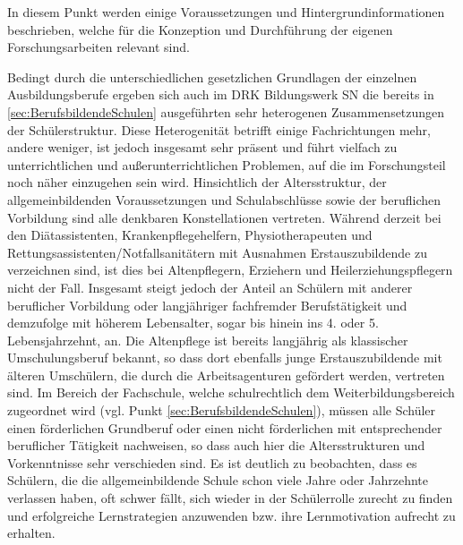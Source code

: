 In diesem Punkt werden einige Voraussetzungen und Hintergrundinformationen beschrieben, welche für die Konzeption und Durchführung der eigenen Forschungsarbeiten relevant sind. 

Bedingt durch die unterschiedlichen gesetzlichen Grundlagen der einzelnen Ausbildungsberufe ergeben sich auch im DRK Bildungswerk SN die bereits in \ref{sec:BerufsbildendeSchulen} ausgeführten sehr heterogenen Zusammensetzungen der Schülerstruktur. Diese Heterogenität betrifft einige Fachrichtungen mehr, andere weniger, ist jedoch insgesamt sehr präsent und führt vielfach zu unterrichtlichen und außerunterrichtlichen Problemen, auf die im Forschungsteil noch näher einzugehen sein wird. Hinsichtlich der Altersstruktur, der allgemeinbildenden Voraussetzungen und Schulabschlüsse sowie der beruflichen Vorbildung sind alle denkbaren Konstellationen vertreten. Während derzeit bei den Diätassistenten, Krankenpflegehelfern, Physiotherapeuten und Rettungsassistenten/Notfallsanitätern mit Ausnahmen Erstauszubildende zu verzeichnen sind, ist dies bei Altenpflegern, Erziehern und Heilerziehungspflegern nicht der Fall. Insgesamt steigt jedoch der Anteil an Schülern mit anderer beruflicher Vorbildung oder langjähriger fachfremder Berufstätigkeit und demzufolge mit höherem Lebensalter, sogar bis hinein ins 4. oder 5. Lebensjahrzehnt, an. Die Altenpflege ist bereits langjährig als klassischer Umschulungsberuf bekannt, so dass dort ebenfalls junge Erstauszubildende mit älteren Umschülern, die durch die Arbeitsagenturen gefördert werden, vertreten sind. Im Bereich der Fachschule, welche schulrechtlich dem Weiterbildungsbereich zugeordnet wird (vgl. Punkt \ref{sec:BerufsbildendeSchulen}), müssen alle Schüler einen förderlichen Grundberuf oder einen nicht förderlichen mit entsprechender beruflicher Tätigkeit nachweisen, so dass auch hier die Altersstrukturen und Vorkenntnisse sehr verschieden sind. Es ist deutlich zu beobachten, dass es Schülern, die die allgemeinbildende Schule schon viele Jahre oder Jahrzehnte verlassen haben, oft schwer fällt, sich wieder in der Schülerrolle zurecht zu finden und erfolgreiche Lernstrategien anzuwenden bzw. ihre Lernmotivation aufrecht zu erhalten.

